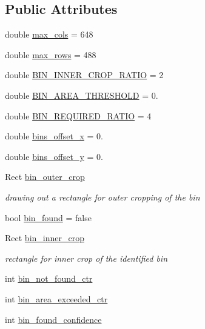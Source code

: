 \subsection*{Public Attributes}
\begin{DoxyCompactItemize}
\item 
double \hyperlink{classAlignBin_af984c9ffbeeebfae750ac2237c518ec2}{max\+\_\+cols} = 648
\item 
double \hyperlink{classAlignBin_a193530ae6dfca9e25a6b77e19b6f4f52}{max\+\_\+rows} = 488
\item 
double \hyperlink{classAlignBin_a130959da7ec516d944a30541c1d674f7}{B\+I\+N\+\_\+\+I\+N\+N\+E\+R\+\_\+\+C\+R\+O\+P\+\_\+\+R\+A\+T\+IO} = 2
\item 
double \hyperlink{classAlignBin_a5c32224007789c06f6be5714512ca506}{B\+I\+N\+\_\+\+A\+R\+E\+A\+\_\+\+T\+H\+R\+E\+S\+H\+O\+LD} = 0.
\item 
double \hyperlink{classAlignBin_adedde6dfe9b6e35c372fa034cf401351}{B\+I\+N\+\_\+\+R\+E\+Q\+U\+I\+R\+E\+D\+\_\+\+R\+A\+T\+IO} = 4
\item 
double \hyperlink{classAlignBin_ad994bd3d6dcef6be1f1aca871e6ed1e1}{bins\+\_\+offset\+\_\+x} = 0.
\item 
double \hyperlink{classAlignBin_ae70b486d82daa5ee833b7cd2bd7a8747}{bins\+\_\+offset\+\_\+y} = 0.
\item 
Rect \hyperlink{classAlignBin_af344ab74a824162b23ca841b8a4048df}{bin\+\_\+outer\+\_\+crop}
\begin{DoxyCompactList}\small\item\em drawing out a rectangle for outer cropping of the bin \end{DoxyCompactList}\item 
bool \hyperlink{classAlignBin_a4bf78a8707f32a306a8871c438c93fc5}{bin\+\_\+found} = false
\item 
Rect \hyperlink{classAlignBin_a0f14b89a2a1f3567525de7c8295aca56}{bin\+\_\+inner\+\_\+crop}
\begin{DoxyCompactList}\small\item\em rectangle for inner crop of the identified bin \end{DoxyCompactList}\item 
int \hyperlink{classAlignBin_a261b3b8844de979b325428c812885d84}{bin\+\_\+not\+\_\+found\+\_\+ctr}
\item 
int \hyperlink{classAlignBin_abc20afd816e513b776e6a14ecd522379}{bin\+\_\+area\+\_\+exceeded\+\_\+ctr}
\item 
int \hyperlink{classAlignBin_a17f0142a68dbcdd10faf27361e5e4098}{bin\+\_\+found\+\_\+confidence}

\end{DoxyCompactItemize}
